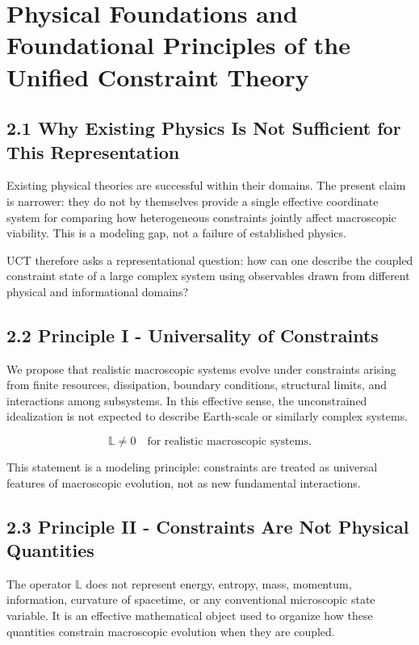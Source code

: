 ﻿\section{Physical Foundations and Foundational Principles of the Unified Constraint Theory}


\subsection{2.1 Why Existing Physics Is Not Sufficient for This Representation}

Existing physical theories are successful within their domains. The present claim is narrower: they do not by themselves provide a single effective coordinate system for comparing how heterogeneous constraints jointly affect macroscopic viability. This is a modeling gap, not a failure of established physics.

UCT therefore asks a representational question: how can one describe the coupled constraint state of a large complex system using observables drawn from different physical and informational domains?

\subsection{2.2 Principle I - Universality of Constraints}

We propose that realistic macroscopic systems evolve under constraints arising from finite resources, dissipation, boundary conditions, structural limits, and interactions among subsystems. In this effective sense, the unconstrained idealization is not expected to describe Earth-scale or similarly complex systems.

\[ \mathbb{L} \neq 0 \quad \text{for realistic macroscopic systems.} \]

This statement is a modeling principle: constraints are treated as universal features of macroscopic evolution, not as new fundamental interactions.

\subsection{2.3 Principle II - Constraints Are Not Physical Quantities}

The operator \(\mathbb{L}\) does not represent energy, entropy, mass, momentum, information, curvature of spacetime, or any conventional microscopic state variable. It is an effective mathematical object used to organize how these quantities constrain macroscopic evolution when they are coupled.


